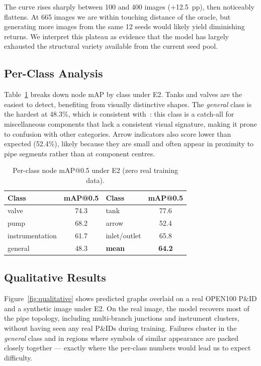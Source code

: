 The curve rises sharply between 100 and 400 images (+12.5~pp), then
noticeably flattens.
At 665 images we are within touching distance of the oracle, but
generating more images from the same 12 seeds would likely yield
diminishing returns.
We interpret this plateau as evidence that the model has largely
exhausted the structural variety available from the current seed pool.

\subsection{Per-Class Analysis}
\label{sec:exp:perclass}

Table~\ref{tab:per_class} breaks down node mAP by class under E2.
Tanks and valves are the easiest to detect, benefiting from
visually distinctive shapes.
The \textit{general} class is the hardest at 48.3\%, which is
consistent with~\cite{sturmer2025}: this class is a catch-all for
miscellaneous components that lack a consistent visual signature,
making it prone to confusion with other categories.
Arrow indicators also score lower than expected (52.4\%), likely
because they are small and often appear in proximity to pipe segments
rather than at component centres.

\begin{table}[h]
\centering
\caption{Per-class node mAP@0.5 under E2 (zero real training data).}
\label{tab:per_class}
\small
\begin{tabular}{lc|lc}
\toprule
Class           & mAP@0.5 & Class        & mAP@0.5 \\
\midrule
valve           & 74.3    & tank         & 77.6 \\
pump            & 68.2    & arrow        & 52.4 \\
instrumentation & 61.7    & inlet/outlet & 65.8 \\
general         & 48.3    & \textbf{mean}& \textbf{64.2} \\
\bottomrule
\end{tabular}
\end{table}

\subsection{Qualitative Results}
\label{sec:exp:qualitative}

Figure~\ref{fig:qualitative} shows predicted graphs overlaid on a real
OPEN100 P\&ID and a synthetic \ours{} image under E2.
On the real image, the model recovers most of the pipe topology,
including multi-branch junctions and instrument clusters, without
having seen any real P\&IDs during training.
Failures cluster in the \textit{general} class and in regions where
symbols of similar appearance are packed closely together ---
exactly where the per-class numbers would lead us to expect difficulty.

